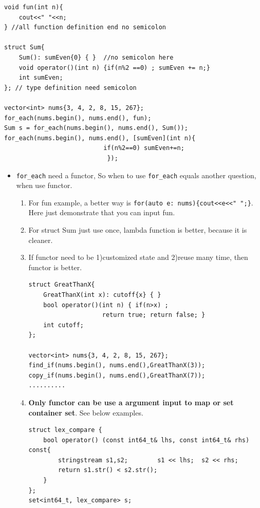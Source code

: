 \documentclass[a4paper,11pt,twoside]{book}
\begin{document}
\begin{lstlisting}[numbers=none]
void fun(int n){
    cout<<" "<<n;
} //all function definition end no semicolon

struct Sum{
    Sum(): sumEven{0} { }  //no semicolon here
    void operator()(int n) {if(n%2 ==0) ; sumEven += n;}
    int sumEven;
}; // type definition need semicolon

vector<int> nums{3, 4, 2, 8, 15, 267};
for_each(nums.begin(), nums.end(), fun);
Sum s = for_each(nums.begin(), nums.end(), Sum());
for_each(nums.begin(), nums.end(), [sumEven](int n){
                           if(n%2==0) sumEven+=n;
                            });
\end{lstlisting}

\begin{itemize}
\item \texttt{for\_each} need a functor, So when to use \texttt{for\_each} equals another question, when use functor.
\begin{enumerate}
\item For fun example, a better way is \texttt{for(auto e: nums)\{cout<<e<<" ";\}}. Here just demonstrate that  you can input fun.

\item For struct Sum just use once, lambda function is better, because it is cleaner.

\item If functor need to be 1)customized state and 2)reuse many time, then functor is better.
\begin{lstlisting}[numbers=none]
struct GreatThanX{
    GreatThanX(int x): cutoff{x} { } 
    bool operator()(int n) { if(n>x) ; 
                    return true; return false; }
    int cutoff;
};

vector<int> nums{3, 4, 2, 8, 15, 267};
find_if(nums.begin(), nums.end(),GreatThanX(3));
copy_if(nums.begin(), nums.end(),GreatThanX(7));
..........
\end{lstlisting}
\item \textbf{Only functor can be use a argument input to map or set container set}. See below examples.

\begin{lstlisting}[numbers=none]
struct lex_compare {
    bool operator() (const int64_t& lhs, const int64_t& rhs) const{
        stringstream s1,s2;        s1 << lhs;  s2 << rhs;
        return s1.str() < s2.str();
    }
};
set<int64_t, lex_compare> s;
\end{lstlisting}



\end{enumerate}
\end{itemize}
\end{document}
